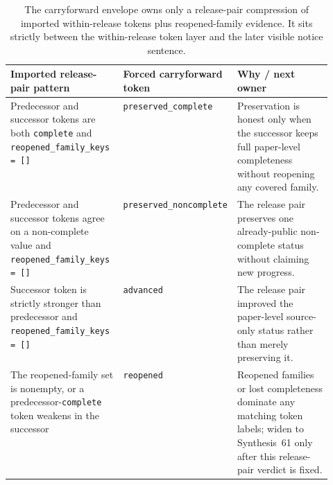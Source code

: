 \documentclass[11pt]{article}
\begin{document}
\begin{table}[t]
\centering
\small
\begin{tabularx}{0.97\linewidth}{@{}p{0.35\linewidth}p{0.19\linewidth}X@{}}
\toprule
\textbf{Imported release-pair pattern} & \textbf{Forced carryforward token} & \textbf{Why / next owner}\\
\midrule
Predecessor and successor tokens are both \texttt{complete} and \texttt{reopened\_family\_keys = []} & \texttt{preserved\_complete} & Preservation is honest only when the successor keeps full paper-level completeness without reopening any covered family.\\
Predecessor and successor tokens agree on a non-complete value and \texttt{reopened\_family\_keys = []} & \texttt{preserved\_noncomplete} & The release pair preserves one already-public non-complete status without claiming new progress.\\
Successor token is strictly stronger than predecessor and \texttt{reopened\_family\_keys = []} & \texttt{advanced} & The release pair improved the paper-level source-only status rather than merely preserving it.\\
The reopened-family set is nonempty, or a predecessor-\texttt{complete} token weakens in the successor & \texttt{reopened} & Reopened families or lost completeness dominate any matching token labels; widen to Synthesis~61 only after this release-pair verdict is fixed.\\
\bottomrule
\end{tabularx}
\caption{The carryforward envelope owns only a release-pair compression of imported within-release tokens plus reopened-family evidence. It sits strictly between the within-release token layer and the later visible notice sentence.}
\label{tab:public-request-carryforward-token-matrix}
\end{table}
\end{document}
